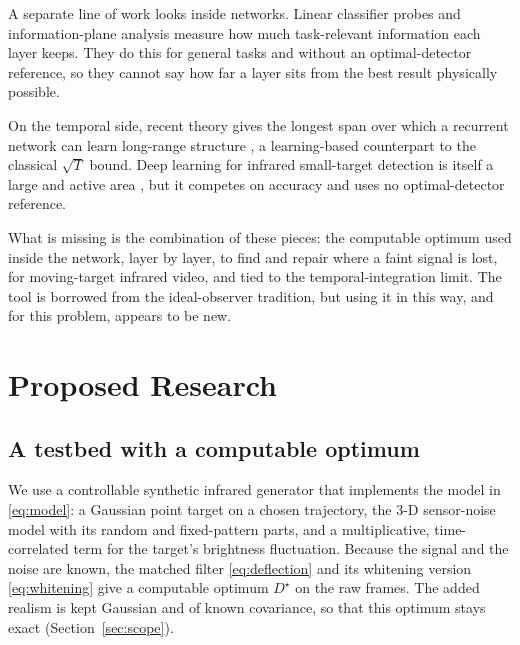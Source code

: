 \documentclass[11pt]{article}
\begin{document}
A separate line of work looks inside networks. Linear classifier probes
\cite{alain} and information-plane analysis \cite{tishbyblackbox,ib} measure how
much task-relevant information each layer keeps. They do this for general tasks
and without an optimal-detector reference, so they cannot say how far a layer
sits from the best result physically possible.

On the temporal side, recent theory gives the longest span over which a recurrent
network can learn long-range structure \cite{livi}, a learning-based counterpart
to the classical $\sqrt{T}$ bound. Deep learning for infrared small-target
detection is itself a large and active area \cite{cheng}, but it competes on
accuracy and uses no optimal-detector reference.

What is missing is the combination of these pieces: the computable optimum used
inside the network, layer by layer, to find and repair where a faint signal is
lost, for moving-target infrared video, and tied to the temporal-integration
limit. The tool is borrowed from the ideal-observer tradition, but using it in
this way, and for this problem, appears to be new.

\section{Proposed Research}

\subsection{A testbed with a computable optimum}
We use a controllable synthetic infrared generator that implements the model in
\eqref{eq:model}: a Gaussian point target on a chosen trajectory, the 3-D
sensor-noise model \cite{dagostino} with its random and fixed-pattern parts, and
a multiplicative, time-correlated term for the target's brightness fluctuation.
Because the signal and the noise are known, the matched filter
\eqref{eq:deflection} and its whitening version \eqref{eq:whitening} give a
computable optimum $D^\star$ on the raw frames. The added realism is kept Gaussian
and of known covariance, so that this optimum stays exact (Section~\ref{sec:scope}).
\end{document}
